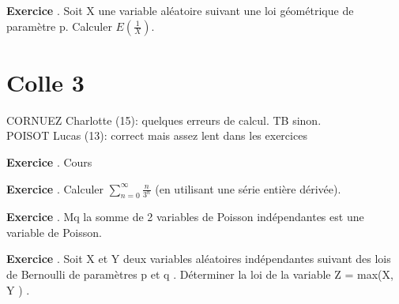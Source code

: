 \documentclass[10pt,a4paper]{article}
\newcounter{question}
\newcounter{exo}
\newenvironment{exo}{\vspace{0.5cm}\setcounter{question}{0}\addtocounter{exo}{1} \noindent \textbf{Exercice \theexo}. \normalsize }{\par}
\begin{document}
	\begin{exo}
		Soit X une variable aléatoire suivant une loi géométrique de paramètre p. Calculer $E(\frac{1}{X})$.
	\end{exo}
	
	\section*{Colle 3}
	\setcounter{exo}{0}
	CORNUEZ Charlotte (15): quelques erreurs de calcul. TB sinon.\\
	POISOT Lucas (13): correct mais assez lent dans les exercices

	\begin{exo}
		Cours
	\end{exo}

	\begin{exo}
		Calculer $\sum_{n=0}^{\infty} \frac{n}{3^n}$ (en utilisant une série entière dérivée).
	\end{exo}

	\begin{exo}
		Mq la somme de 2 variables de Poisson indépendantes est une variable de Poisson.
	\end{exo}
	
	\begin{exo}
		Soit X et Y deux variables aléatoires indépendantes suivant des lois de
		Bernoulli de paramètres p et q . Déterminer la loi de la variable
		Z = max(X, Y ) .
	\end{exo}
	
\end{document}
